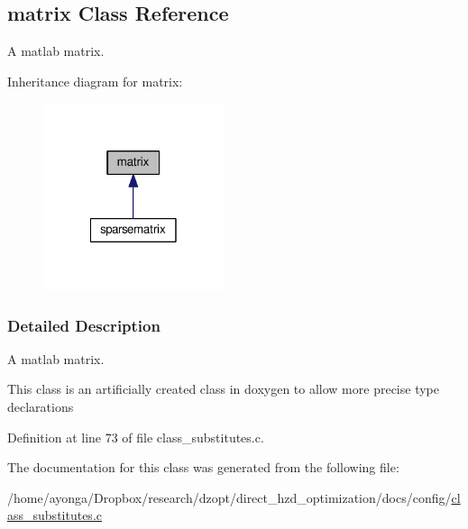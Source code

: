 \hypertarget{classmatrix}{}\subsection{matrix Class Reference}
\label{classmatrix}


A matlab matrix.  




Inheritance diagram for matrix\+:
\nopagebreak
\begin{figure}[H]
\begin{center}
\leavevmode
\includegraphics[width=150pt]{classmatrix__inherit__graph}
\end{center}
\end{figure}


\subsubsection{Detailed Description}
A matlab matrix. 

This class is an artificially created class in doxygen to allow more precise type declarations 

Definition at line 73 of file class\+\_\+substitutes.\+c.



The documentation for this class was generated from the following file\+:\begin{DoxyCompactItemize}
\item 
/home/ayonga/\+Dropbox/research/dzopt/direct\+\_\+hzd\+\_\+optimization/docs/config/\hyperlink{class__substitutes_8c}{class\+\_\+substitutes.\+c}\end{DoxyCompactItemize}
